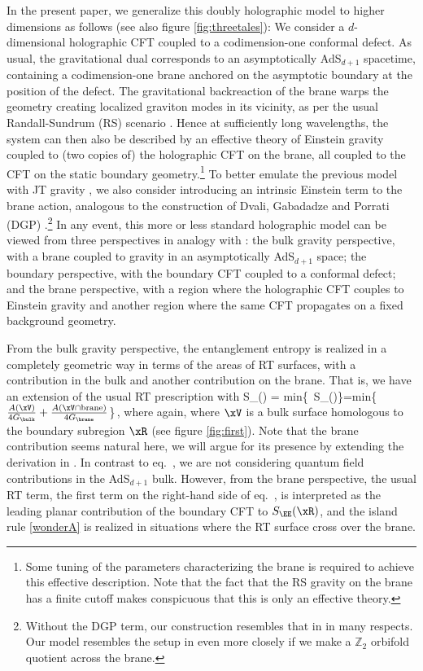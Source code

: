 In the present paper, we generalize this doubly holographic model to higher dimensions as follows (see also figure \ref{fig:threetales}): We consider a $d$-dimensional holographic CFT coupled to a codimension-one conformal defect. As usual, the gravitational dual corresponds to an asymptotically AdS$_{d+1}$ spacetime, containing a codimension-one brane anchored on the asymptotic boundary at the position of the defect. The gravitational backreaction of the brane warps the geometry creating localized graviton modes in its vicinity, as per the usual Randall-Sundrum (RS) scenario \cite{Randall:1999ee,Randall:1999vf,Karch:2000ct}. Hence at sufficiently long wavelengths, the system can then also be described by an effective theory of Einstein gravity coupled to (two copies of) the holographic CFT on the brane, all coupled to the CFT on the static boundary geometry.\footnote{Some tuning of the parameters characterizing the brane is required to achieve this effective description. Note that the fact that the RS gravity on the brane has a finite cutoff \cite{Randall:1999ee,Randall:1999vf} makes conspicuous that this is only an effective theory.} To better emulate the previous model with JT gravity \cite{Almheiri:2019hni}, we also consider introducing an intrinsic Einstein term to the brane action, analogous to the construction of Dvali, Gabadadze and Porrati (DGP) \cite{Dvali:2000hr}.\footnote{Without the DGP term, our construction resembles that in \cite{Rozali:2019day} in many respects. Our model resembles the setup in \cite{Almheiri:2019hni} even more closely if we make a $\mathbb Z_2$ orbifold quotient across the brane.}  In any event, this more or less standard holographic model can be viewed from three perspectives in analogy with \cite{Almheiri:2019hni}: the bulk gravity perspective, with a brane coupled to gravity in an asymptotically AdS$_{d+1}$ space; the boundary perspective, with the boundary CFT coupled to a conformal defect; and the brane perspective, with a region where the holographic CFT couples to Einstein gravity and another region where the same CFT propagates on a fixed background geometry.

From the bulk gravity perspective, the entanglement entropy is realized in a completely geometric way in terms of the areas of RT surfaces, with a contribution in the bulk and another contribution on the brane. That is, we have an extension of the usual RT prescription with
\beq
 S_\EE(\xR) = {\rm min}\left\{\extr\,
 S_\gen(\xV)\right\}={\rm min}\left\{\extr
  \(
  \frac{A(\xV)}{4 G_\bulk} + \frac{A(\xV \cap {\rm brane})}{4 G_\brane}\)\right\}\,,
 \label{eq:sad0}
\eeq
where again, where $\xV$ is a bulk surface homologous to the boundary subregion $\xR$ (see figure \ref{fig:first}). Note that the brane contribution seems natural here, we will argue for its presence by extending the derivation in \cite{Myers:2010tj}. In contrast to eq.~, we are not considering quantum field contributions in the AdS$_{d+1}$ bulk. However, from the brane perspective, the usual RT term, \ie the first term on the right-hand side of eq.~, is interpreted as the leading planar contribution of the boundary CFT to $S_\EE(\xR)$, and the island rule \eqref{wonderA} is realized in situations where the RT surface cross over the brane. 

